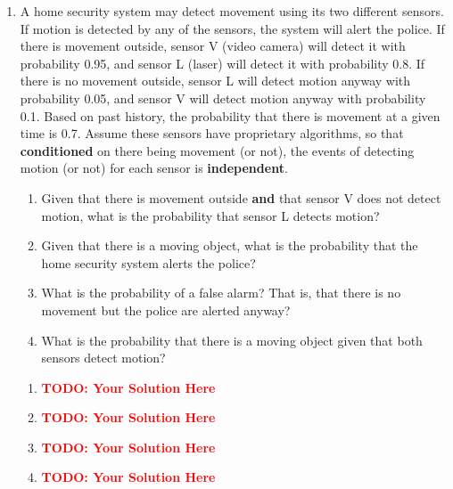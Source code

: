 \documentclass[12pt]{article}
\def\todo#1{\textcolor{red}{\textbf{#1}}}
\renewcommand{\|}{\mid}
\begin{document}
\begin{enumerate}
\item A home security system may detect movement using its two different sensors. If motion is detected by any of the sensors, the system will alert the police. If there is movement outside, sensor V (video camera) will detect it with probability 0.95, and sensor L (laser) will detect it with probability 0.8. If there is no movement outside, sensor L will detect motion anyway with probability 0.05, and sensor V will detect motion anyway with probability 0.1. Based on past history, the probability that there is movement at a given time is 0.7. Assume these sensors have proprietary algorithms, so that \textbf{conditioned} on there being
movement (or not), the events of detecting motion (or not) for each sensor is \textbf{independent}.
\begin{enumerate}
    \item Given that there is movement outside \textbf{and} that sensor V does not detect motion, what is the probability that sensor L detects motion? \item Given that there is a moving object, what is the probability that the home security system alerts the police?
    \item What is the probability of a false alarm? That is, that there is no movement but the police are alerted anyway? 
    \item What is the probability that there is a moving object given that both sensors detect motion?
\end{enumerate}

\begin{tcolorbox}
\begin{enumerate}
\item \todo{TODO: Your Solution Here}
\item \todo{TODO: Your Solution Here}
\item \todo{TODO: Your Solution Here}
\item \todo{TODO: Your Solution Here}
\end{enumerate}
\end{tcolorbox}

\newpage 


\end{enumerate}
\end{document}
